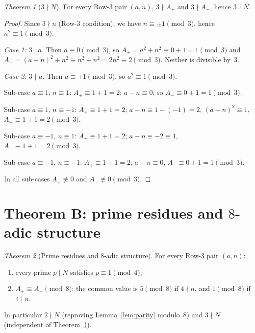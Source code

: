 \documentclass[12pt]{amsart}
\theoremstyle{plain}
\theoremstyle{definition}
\theoremstyle{remark}
\newtheorem{mainthm}{Theorem}
\newcommand{\Aplus}{A_{+}}
\newcommand{\Aminus}{A_{-}}
\begin{document}
\begin{mainthm}[$3\nmid N$]
\label{thm:3prime}
For every Row-3 pair $(a,n)$, $3\nmid \Aplus$ and $3\nmid\Aminus$,
hence $3\nmid N$.
\end{mainthm}

\begin{proof}
Since $3\nmid n$ (Row-3 condition), we have $n\equiv\pm 1\pmod{3}$,
hence $n^2\equiv 1\pmod{3}$.

\emph{Case 1: $3\mid a$.}  Then $a\equiv 0\pmod{3}$, so
$\Aplus = a^2+n^2\equiv 0+1=1\pmod{3}$ and
$\Aminus = (a-n)^2+n^2\equiv n^2+n^2 = 2n^2\equiv 2\pmod{3}$.
Neither is divisible by~$3$.

\emph{Case 2: $3\nmid a$.}  Then $a\equiv\pm 1\pmod{3}$, so $a^2\equiv 1\pmod{3}$.

Sub-case $a\equiv 1,\, n\equiv 1$: $\Aplus\equiv 1+1=2$;
$a-n\equiv 0$, so $\Aminus\equiv 0+1=1\pmod{3}$.

Sub-case $a\equiv 1,\, n\equiv -1$: $\Aplus\equiv 1+1=2$;
$a-n\equiv 1-(-1)=2$, $(a-n)^2\equiv 1$, $\Aminus\equiv 1+1=2\pmod{3}$.

Sub-case $a\equiv -1,\, n\equiv 1$: $\Aplus\equiv 1+1=2$;
$a-n\equiv -2\equiv 1$, $\Aminus\equiv 1+1=2\pmod{3}$.

Sub-case $a\equiv -1,\, n\equiv -1$: $\Aplus\equiv 1+1=2$;
$a-n\equiv 0$, $\Aminus\equiv 0+1=1\pmod{3}$.

In all sub-cases $\Aplus\not\equiv 0$ and $\Aminus\not\equiv 0\pmod{3}$.
\end{proof}

\section{Theorem B: prime residues and $8$-adic structure}
\label{sec:thmmod4}%

\begin{mainthm}[Prime residues and $8$-adic structure]
\label{thm:mod4}
For every Row-3 pair $(a,n)$:
\begin{enumerate}[label=\textup{(\roman*)}]
\item every prime $p\mid N$ satisfies $p\equiv 1\pmod{4}$;
\item $\Aplus\equiv\Aminus\pmod{8}$; the common value is $5\pmod{8}$
  if $4\nmid n$, and $1\pmod{8}$ if $4\mid n$.
\end{enumerate}
In particular $2\nmid N$ (reproving Lemma~\ref{lem:parity} modulo~$8$)
and $3\nmid N$ (independent of Theorem~\ref{thm:3prime}).
\end{mainthm}
\end{document}
